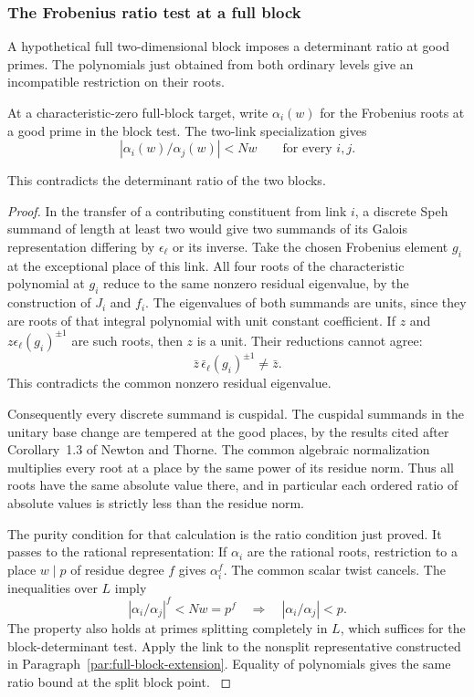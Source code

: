 \subsubsection{The Frobenius ratio test at a full block}
\label{par:count-two-purity}

A hypothetical full two-dimensional block imposes a determinant ratio at good primes. The polynomials just obtained from both ordinary levels give an incompatible restriction on their roots.

\begin{proposition}\label{prop:count-two-full-block-excluded}
At a characteristic-zero full-block target, write \(\alpha_i(w)\) for the Frobenius roots at a good prime in the block test. The two-link specialization gives 
\[
 |\alpha_i(w)/\alpha_j(w)|<Nw\qquad\text{for every }i,j.
\]

This contradicts the determinant ratio of the two blocks.
\end{proposition}

\begin{proof}
In the transfer of a contributing constituent from link \(i\),
a discrete Speh summand of length at least two would give two
summands of its Galois representation differing by
\(\epsilon_\ell\) or its inverse. Take the chosen Frobenius
element \(g_i\) at the exceptional place of this link.
All four roots of the characteristic polynomial at \(g_i\)
reduce to the same nonzero residual eigenvalue, by the
construction of \(J_i\) and \(f_i\). The eigenvalues of both
summands are units, since they are roots of that integral
polynomial with unit constant coefficient. If \(z\) and \(z\epsilon_\ell(g_i)^{\pm1}\) are such roots,
then \(z\) is a unit. Their reductions cannot agree:
\[
              \bar z\,\bar\epsilon_\ell(g_i)^{\pm1}\ne\bar z .
\]
This contradicts the common nonzero residual eigenvalue.

Consequently every discrete summand is cuspidal. The
cuspidal summands in the unitary base change are tempered
at the good places, by the results cited after
Corollary~1.3 of Newton and Thorne. The common algebraic
normalization multiplies every root at a place by the same
power of its residue norm. Thus all roots have the same
absolute value there, and in particular each ordered ratio
of absolute values is strictly less than the residue norm.

The purity condition for that calculation is the ratio condition just proved. It passes to the rational representation:
If \(\alpha_i\) are the rational roots, restriction to a
place \(w\mid p\) of residue degree \(f\) gives \(\alpha_i^f\).
The common scalar twist cancels. The inequalities over \(L\) imply
\[
              |\alpha_i/\alpha_j|^f<Nw=p^f
            \quad\Longrightarrow\quad|\alpha_i/\alpha_j|<p.
\] The property
also holds at primes splitting completely in \(L\), which
suffices for the block-determinant test. Apply the link to
the nonsplit representative constructed in
Paragraph~\ref{par:full-block-extension}. Equality of polynomials
gives the same ratio bound at the split block point.
\hfill\mbox{\cite{newton-thorne-unitary}}\label{cor:ordinary-count-ii-point-output-2}

\end{proof}

